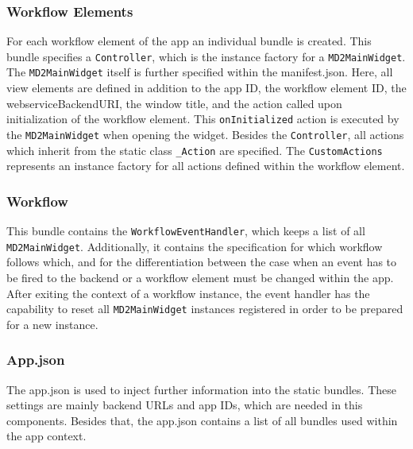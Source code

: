 \subsubsection{Workflow Elements}

For each workflow element of the app an individual bundle is created. This bundle specifies a \lstinline|Controller|, which is the instance factory for a \lstinline|MD2MainWidget|. The \lstinline|MD2MainWidget| itself is further specified within the manifest.json. Here, all view elements are defined in addition to the app ID, the workflow element ID, the webserviceBackendURI, the window title, and the action called upon initialization of the workflow element. This \lstinline|onInitialized| action is executed by the \lstinline|MD2MainWidget| when opening the widget. Besides the \lstinline|Controller|, all actions which inherit from the static class \lstinline|_Action| are specified. The \lstinline|CustomActions| represents an instance factory for all actions defined within the workflow element.

\subsubsection{Workflow}
This bundle contains the \lstinline|WorkflowEventHandler|, which keeps a list of all  \lstinline|MD2MainWidget|. Additionally, it contains the specification for which workflow follows which, and for the differentiation between the case when an event has to be fired to the backend or a workflow element must be changed within the app. After exiting the context of a workflow instance, the event handler has the capability to reset all \lstinline|MD2MainWidget| instances registered in order to be prepared for a new instance.

\subsubsection{App.json} \label{subsubsec:mapapps-generated-appjson}
The app.json is used to inject further information into the static bundles. These settings are mainly backend URLs and app IDs, which are needed in this components.
Besides that, the app.json  contains a list of all bundles used within the app context.
